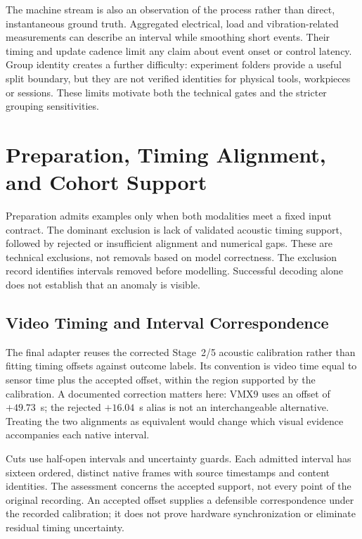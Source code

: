 The machine stream is also an observation of the process rather than direct,
instantaneous ground truth. Aggregated electrical, load and vibration-related
measurements can describe an interval while smoothing short events. Their timing and
update cadence limit any claim about event onset or control latency. Group identity
creates a further difficulty: experiment folders provide a useful split boundary, but
they are not verified identities for physical tools, workpieces or sessions. These
limits motivate both the technical gates and the stricter grouping sensitivities.

\section{Preparation, Timing Alignment, and Cohort Support}
Preparation admits examples only when both modalities meet a fixed input contract. The
dominant exclusion is lack of validated acoustic timing support, followed by rejected or
insufficient alignment and numerical gaps. These are technical exclusions, not removals
based on model correctness. The exclusion record identifies intervals removed before
modelling. Successful decoding alone does not establish that an anomaly is visible.

\subsection{Video Timing and Interval Correspondence}
The final adapter reuses the corrected Stage~2/5 acoustic calibration rather than
fitting timing offsets against outcome labels. Its convention is video time equal to
sensor time plus the accepted offset, within the region supported by the calibration. A
documented correction matters here: VMX9 uses an offset of $+49.73$~s; the rejected
$+16.04$~s alias is not an interchangeable alternative. Treating the two alignments as
equivalent would change which visual evidence accompanies each native interval.

Cuts use half-open intervals and uncertainty guards. Each admitted interval has sixteen
ordered, distinct native frames with source timestamps and content identities. The
assessment concerns the accepted support, not every point of the original recording. An
accepted offset supplies a defensible correspondence under the recorded calibration; it
does not prove hardware synchronization or eliminate residual timing uncertainty.

